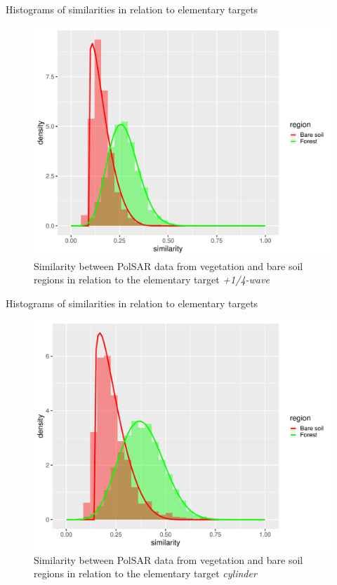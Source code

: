 \documentclass[10pt]{beamer}
\begin{document}
\begin{frame}[fragile]{Histograms of similarities in relation to elementary targets}

\begin{figure}
    \centering
    \includegraphics[width = .6\linewidth]{wvp.pdf}
    \caption{Similarity between PolSAR data from vegetation and bare soil regions in relation to the elementary target \textit{+1/4-wave}}
    \label{fig:wvp}
\end{figure}
    
\end{frame}

\begin{frame}[fragile]{Histograms of similarities in relation to elementary targets}

\begin{figure}
    \centering
    \includegraphics[width = .6\linewidth]{cy.pdf}
    \caption{Similarity between PolSAR data from vegetation and bare soil regions in relation to the elementary target \textit{cylinder}}
    \label{fig:cy}
\end{figure}
    
\end{frame}
\end{document}
